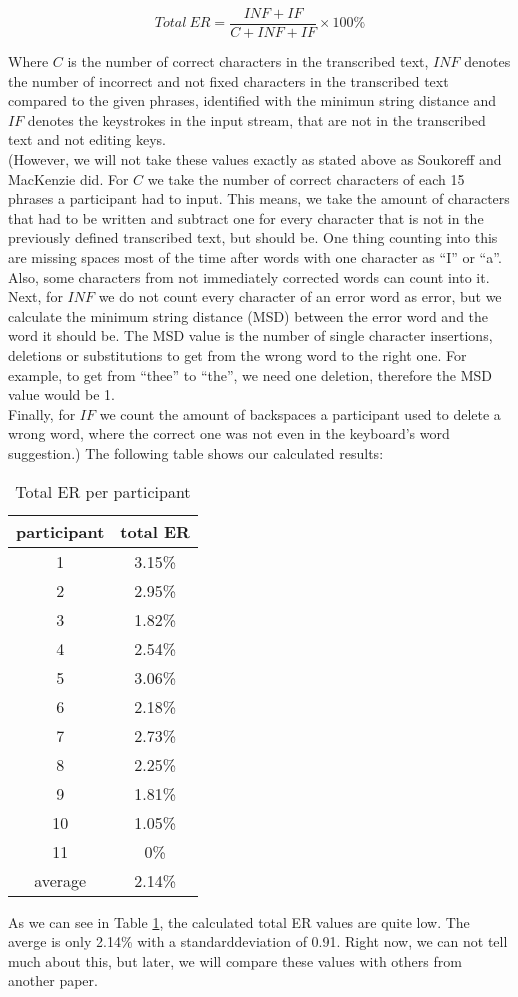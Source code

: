 \begin{equation}
    Total\ ER = \frac{INF + IF}{C + INF + IF} \times 100\%
\end{equation}

Where $C$ is the number of correct characters in the transcribed text, $INF$ denotes the number of incorrect and not fixed characters in the transcribed text compared to the given phrases, identified with the minimun string distance and $IF$ denotes the keystrokes in the input stream, that are not in the transcribed text and not editing keys.\\
(However, we will not take these values exactly as stated above as Soukoreff and MacKenzie \cite{10.1145/642611.642632} did. For $C$ we take the number of correct characters of each 15 phrases a participant had to input. This means, we take the amount of characters that had to be written and subtract one for every character that is not in the previously defined transcribed text, but should be. One thing counting into this are missing spaces most of the time after words with one character as ``I'' or ``a''. Also, some characters from not immediately corrected words can count into it.\\
Next, for $INF$ we do not count every character of an error word as error, but we calculate the minimum string distance (MSD) between the error word and the word it should be. The MSD value is the number of single character insertions, deletions or substitutions to get from the wrong word to the right one. For example, to get from ``thee'' to ``the'', we need one deletion, therefore the MSD value would be 1.\\
Finally, for $IF$ we count the amount of backspaces a participant used to delete a wrong word, where the correct one was not even in the keyboard's word suggestion.) The following table shows our calculated results:
\begin{table}[H]
    \centering
    \caption{Total ER per participant}
    \begin{tabular}{cc} \toprule
        participant&total ER\\ \midrule
        1&3.15\%\\
        2&2.95\%\\
        3&1.82\%\\
        4&2.54\%\\
        5&3.06\%\\
        6&2.18\%\\
        7&2.73\%\\
        8&2.25\%\\
        9&1.81\%\\
        10&1.05\%\\
        11&0\%\\\bottomrule
        average&2.14\%\\
        \bottomrule
    \end{tabular}
    \label{tab:total_er}
\end{table}
As we can see in Table \ref{tab:total_er}, the calculated total ER values are quite low. The averge is only 2.14\% with a standarddeviation of 0.91. Right now, we can not tell much about this, but later, we will compare these values with others from another paper.\\

